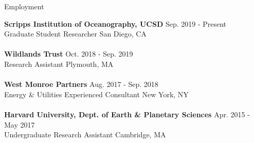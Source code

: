 \documentclass{resume} %
\begin{document}
\begin{rSection}{Employment}

\textbf{Scripps Institution of Oceanography, UCSD} \hfill {Sep. 2019 - Present} \\ 
Graduate Student Researcher \hfill {San Diego, CA}
\\ \\ 
\textbf{Wildlands Trust} \hfill{Oct. 2018 - Sep. 2019} \\ 
Research Assistant \hfill {Plymouth, MA} 
\\ \\
\textbf{West Monroe Partners} \hfill{Aug. 2017 - Sep. 2018} \\ 
Energy \& Utilities Experienced Consultant \hfill {New York, NY} 
\\ \\ 
\textbf{Harvard University, Dept. of Earth \& Planetary Sciences} \hfill {Apr. 2015 - May 2017}\\ 
Undergraduate Research Assistant \hfill{Cambridge, MA}

\end{rSection}

\end{document}
